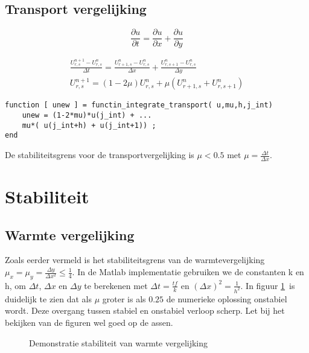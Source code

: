 \documentclass[11pt]{article} %
\begin{document}
	\subsection{Transport vergelijking}
		\begin{equation}
			\frac{\partial u}{\partial t} = \frac{\partial u}{\partial x} + \frac{\partial u}{\partial y}
		\end{equation}
		
		\begin{eqnarray}
			\frac{U_{r,s}^{n+1} - U_{r,s}^n}{\Delta t} = 
			\frac{U^n_{r+1,s} -U^n_{r,s}}{\Delta x} +
			\frac{U^n_{r,s+1} -U^n_{r,s}}{\Delta y} \\
			U_{r,s}^{n+1} = (1 - 2 \mu)U^n_{r,s} + \mu (U^n_{r+1,s}+U^n_{r,s+1})
		\end{eqnarray}
\begin{lstlisting}[caption=Code Explicit Euler,label={lst:expl_euler}]
function [ unew ] = functin_integrate_transport( u,mu,h,j_int)
	unew = (1-2*mu)*u(j_int) + ... 
	mu*( u(j_int+h) + u(j_int+1)) ;
end
\end{lstlisting}
De stabiliteitsgrens voor de transportvergelijking is $\mu < 0.5 $ met $\mu=\frac{\Delta t}{\Delta x}$.  

\section{Stabiliteit}
	\subsection{Warmte vergelijking}
	Zoals eerder vermeld is het stabiliteitsgrens van de warmtevergelijking  $\mu_x=\mu_y=\frac{\Delta y}{\Delta x^2} \leq \frac{1}{4}$. In de Matlab implementatie gebruiken we de constanten k en h, om $\Delta t$, $\Delta x$ en $\Delta y$ te berekenen met $\Delta t=\frac{tf}{k}$ en $(\Delta x)^2 = \frac{1}{h^2}$. In figuur \ref{fig:Warmte}\ is duidelijk te zien dat als $\mu $ groter is als $0.25$ de numerieke oplossing onstabiel wordt. Deze overgang tussen stabiel en onstabiel verloop scherp. Let bij het bekijken van de figuren wel goed op de assen.


	\begin{figure}[H]
		\centering
	\caption{Demonstratie stabiliteit van warmte vergelijking}
	\label{fig:Warmte}
	\end{figure}
	
\end{document}
